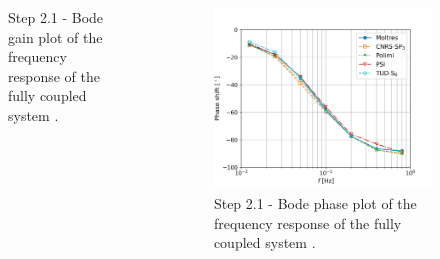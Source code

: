 \begin{frame}
\begin{columns}
\begin{figure}
      \caption{Step 2.1 - Bode gain plot of the frequency response of the fully
      coupled system \cite{park_verification_2022}.}
    \end{figure}
    \column[t]{4cm}
    \begin{figure}
      \centering
      \includegraphics[width=\columnwidth]{../images/2-1-phase-plot}
      \caption{Step 2.1 - Bode phase plot of the frequency response of the fully
      coupled system \cite{park_verification_2022}.}
    \end{figure}
    \hfill
  \end{columns}
\end{frame}
